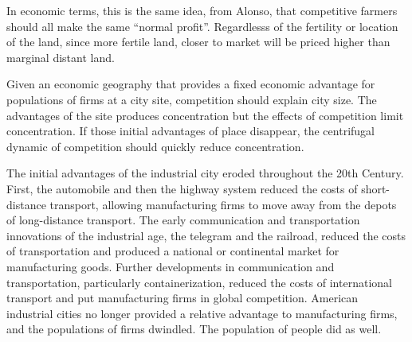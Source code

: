 In economic terms, this is the same idea, from Alonso, that
competitive farmers should all make the same ``normal profit''.
Regardlesss of the fertility or location of the land, since more
fertile land, closer to market will be priced higher than marginal
distant land.

Given an economic geography that provides a fixed economic advantage
for populations of firms at a city site, competition should explain
city size. The advantages of the site produces concentration but the
effects of competition limit concentration. If those initial
advantages of place disappear, the centrifugal dynamic of competition
should quickly reduce concentration.

The initial advantages of the industrial city eroded throughout the
20th Century. First, the automobile and then the highway system
reduced the costs of short-distance transport, allowing manufacturing
firms to move away from the depots of long-distance transport. The
early communication and transportation innovations of the industrial
age, the telegram and the railroad, reduced the costs of
transportation and produced a national or continental market for
manufacturing goods. Further developments in communication and
transportation, particularly containerization, reduced the costs of
international transport and put manufacturing firms in global
competition. American industrial cities no longer provided a relative
advantage to manufacturing firms, and the populations of firms
dwindled. The population of people did as well.






